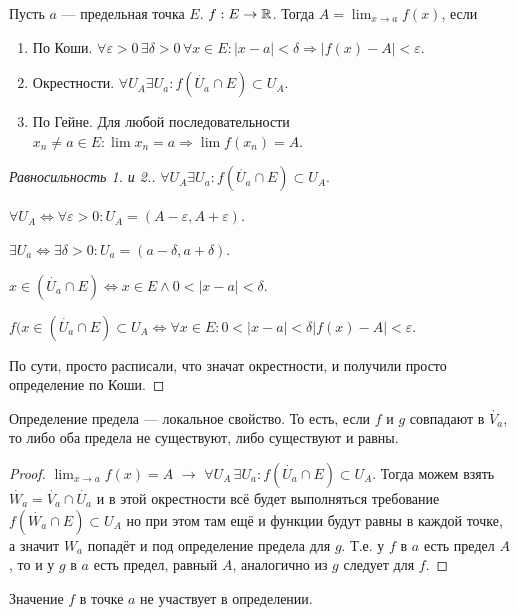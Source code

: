 \begin{definition}
    Пусть $a$ --- предельная точка  $E$.  $f: E \to \mathbb{R}$. Тогда  $A = \lim_{x\to a} f(x)$, если
     \begin{enumerate}
         \item По Коши. $\forall \varepsilon > 0\, \exists \delta >0 \, \forall x \in E: |x-a| < \delta \Rightarrow |f(x) - A| < \varepsilon$.
         \item Окрестности. $\forall U_A \exists U_a: f(\dot{U_a} \cap E) \subset U_A$.
         \item По Гейне. Для любой последовательности  $ x_n \neq a \in E: \lim x_n = a \Rightarrow \lim f(x_n) = A$.
    \end{enumerate}
\end{definition}
\begin{proof}[Равносильность 1. и 2.]
    $\forall U_A \exists U_a: f(\dot{U_a} \cap E) \subset U_A$.  

    $\forall U_A \iff \forall \varepsilon > 0: U_A = (A - \varepsilon, A + \varepsilon)$. 

    $\exists U_a \iff \exists \delta > 0: U_a = (a - \delta, a + \delta)$.  

    $x \in (\dot{U_a} \cap E) \iff x \in E \land  0 < |x-a| < \delta$.  

    $f(x \in (\dot{U_a} \cap E) \subset U_A \iff \forall x \in E : 0 < |x - a| < \delta  |f(x) - A| < \varepsilon$.

    По сути, просто расписали, что значат окрестности, и получили просто определение по Коши.
\end{proof}
\begin{property}
    Определение предела --- локальное свойство. То есть, если $f$ и  $g$ совпадают в  $\dot{V_a}$, то либо оба предела не существуют, либо существуют и равны.
\end{property}
\begin{proof}
	$\lim_{x\to a} f(x) = A$ $\to$ $\forall U_A \, \exists U_a: f(\dot{U_a} \cap E) \subset U_A$. Тогда можем взять $\dot{W_a} = \dot{V_a} \cap \dot{U_a}$ и в этой окрестности всё будет выполняться требование $f(\dot{W_a} \cap E) \subset U_A$ но при этом там ещё и функции будут равны в каждой точке, а значит $W_a$ попадёт и под определение предела для $g$. Т.е. у $f$ в $a$ есть предел $A$, то и у $g$ в $a$ есть предел, равный $A$, аналогично из $g$ следует для $f$.  
\end{proof}
\begin{property}
    Значение $f$ в точке  $a$ не участвует в определении.
\end{property}
